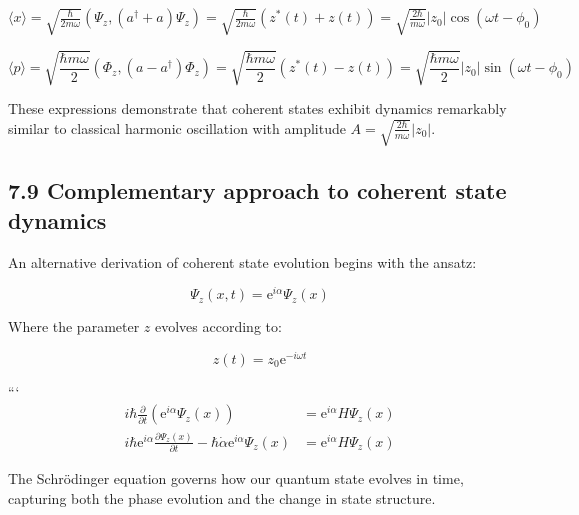 \documentclass[10pt]{article}
\begin{document}
$\langle x\rangle=\sqrt{\frac{\hbar}{2 m \omega}}\left(\Psi_{z},\left(a^{\dagger}+a\right) \Psi_{z}\right)=\sqrt{\frac{\hbar}{2 m \omega}}\left(z^{*}(t)+z(t)\right)=\sqrt{\frac{2 \hbar}{m \omega}}\left|z_{0}\right| \cos \left(\omega t-\phi_{0}\right)$

\begin{equation*}
\langle p\rangle=\sqrt{\frac{\hbar m \omega}{2}}\left(\Phi_{z},\left(a-a^{\dagger}\right) \Phi_{z}\right)=\sqrt{\frac{\hbar m \omega}{2}}\left(z^{*}(t)-z(t)\right)=\sqrt{\frac{\hbar m \omega}{2}}\left|z_{0}\right| \sin \left(\omega t-\phi_{0}\right) \tag{7.90}
\end{equation*}

These expressions demonstrate that coherent states exhibit dynamics remarkably similar to classical harmonic oscillation with amplitude $A=\sqrt{\frac{2 \hbar}{m \omega}}\left|z_{0}\right|$.

\subsection*{7.9 Complementary approach to coherent state dynamics}
An alternative derivation of coherent state evolution begins with the ansatz:

\begin{equation*}
\Psi_{z}(x, t)=\mathrm{e}^{i \alpha} \Psi_{z}(x) \tag{7.91}
\end{equation*}

Where the parameter $z$ evolves according to:

\begin{equation*}
z(t)=z_{0} \mathrm{e}^{-i \omega t} \tag{7.92}
\end{equation*}

```
\begin{align*}
i \hbar \frac{\partial}{\partial t}\left(\mathrm{e}^{i \alpha} \Psi_{z}(x)\right) & =\mathrm{e}^{i \alpha} H \Psi_{z}(x) \\
i \hbar \mathrm{e}^{i \alpha} \frac{\partial \Psi_{z}(x)}{\partial t}-\hbar \dot{\alpha} \mathrm{e}^{i \alpha} \Psi_{z}(x) & =\mathrm{e}^{i \alpha} H \Psi_{z}(x) \tag{7.93}
\end{align*}

The Schrödinger equation governs how our quantum state evolves in time, capturing both the phase evolution and the change in state structure.
\end{document}
